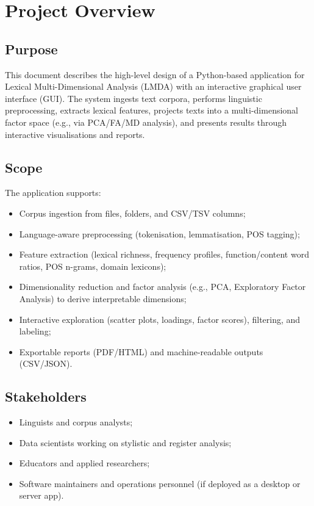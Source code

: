 \section{Project Overview}
\subsection{Purpose}
This document describes the high-level design of a Python-based application for Lexical Multi-Dimensional Analysis (LMDA) with an interactive graphical user interface (GUI). The system ingests text corpora, performs linguistic preprocessing, extracts lexical features, projects texts into a multi-dimensional factor space (e.g., via PCA/FA/MD analysis), and presents results through interactive visualisations and reports.

\subsection{Scope}
The application supports:
\begin{itemize}
    \item Corpus ingestion from files, folders, and CSV/TSV columns;
    \item Language-aware preprocessing (tokenisation, lemmatisation, POS tagging);
    \item Feature extraction (lexical richness, frequency profiles, function/content word ratios, POS n-grams, domain lexicons);
    \item Dimensionality reduction and factor analysis (e.g., PCA, Exploratory Factor Analysis) to derive interpretable dimensions;
    \item Interactive exploration (scatter plots, loadings, factor scores), filtering, and labeling;
    \item Exportable reports (PDF/HTML) and machine-readable outputs (CSV/JSON).
\end{itemize}

\subsection{Stakeholders}
\begin{itemize}
    \item Linguists and corpus analysts;
    \item Data scientists working on stylistic and register analysis;
    \item Educators and applied researchers;
    \item Software maintainers and operations personnel (if deployed as a desktop or server app).
\end{itemize}


